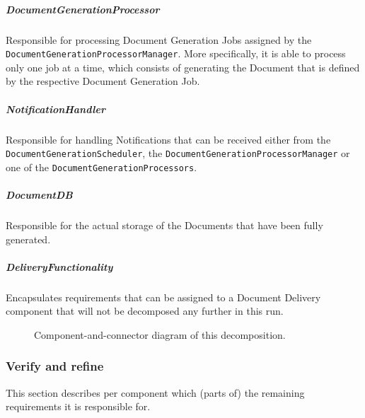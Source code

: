 \documentclass[a4paper,10pt]{article}
\begin{document}
\subparagraph{DocumentGenerationProcessor}
Responsible for processing Document Generation Jobs assigned by the \texttt{DocumentGenerationProcessorManager}. More specifically, it is able to process only one job at a time, which consists of generating the Document that is defined by the respective Document Generation Job.

\subparagraph{NotificationHandler}
Responsible for handling Notifications that can be received either from the \texttt{DocumentGenerationScheduler}, the \texttt{DocumentGenerationProcessorManager} or one of the \texttt{DocumentGenerationProcessors}.

\subparagraph{DocumentDB}
Responsible for the actual storage of the Documents that have been fully generated.

\subparagraph{DeliveryFunctionality}
Encapsulates requirements that can be assigned to a Document Delivery component that will not be decomposed any further in this run.

\begin{figure}[!htp]
    \centering
    \caption{Component-and-connector diagram of this decomposition.
        }\label{fig:it1-cc_main}
\end{figure}

\subsubsection{Verify and refine}
This section describes per component which (parts of) the remaining
requirements it is responsible for.
\end{document}
